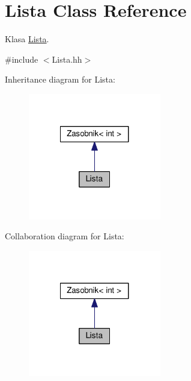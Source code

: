 \hypertarget{a00012}{}\section{Lista Class Reference}
\label{a00012}


Klasa \hyperlink{a00012}{Lista}.  




{\ttfamily \#include $<$Lista.\+hh$>$}



Inheritance diagram for Lista\+:
\nopagebreak
\begin{figure}[H]
\begin{center}
\leavevmode
\includegraphics[width=164pt]{a00134}
\end{center}
\end{figure}


Collaboration diagram for Lista\+:
\nopagebreak
\begin{figure}[H]
\begin{center}
\leavevmode
\includegraphics[width=164pt]{a00135}
\end{center}
\end{figure}
